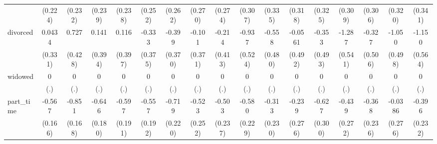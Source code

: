 {\begin{tabular}{l*{16}{c}}
                    &     (0.224)         &     (0.232)         &     (0.239)         &     (0.238)         &     (0.252)         &     (0.262)         &     (0.270)         &     (0.274)         &     (0.307)         &     (0.335)         &     (0.318)         &     (0.325)         &     (0.309)         &     (0.306)         &     (0.320)         &     (0.341)         \\
[1em]
divorced            &      0.0434         &       0.727         &       0.141         &       0.116         &      -0.333         &      -0.399         &      -0.101         &      -0.214         &      -0.937         &      -0.558         &     -0.0561         &      -0.353         &      -1.287\sym{*}  &      -0.327         &      -1.050\sym{*}  &      -1.150\sym{*}  \\
                    &     (0.331)         &     (0.428)         &     (0.394)         &     (0.397)         &     (0.375)         &     (0.370)         &     (0.371)         &     (0.413)         &     (0.524)         &     (0.480)         &     (0.492)         &     (0.493)         &     (0.541)         &     (0.506)         &     (0.498)         &     (0.564)         \\
[1em]
widowed             &           0         &           0         &           0         &           0         &           0         &           0         &           0         &           0         &           0         &           0         &           0         &           0         &           0         &           0         &           0         &           0         \\
                    &         (.)         &         (.)         &         (.)         &         (.)         &         (.)         &         (.)         &         (.)         &         (.)         &         (.)         &         (.)         &         (.)         &         (.)         &         (.)         &         (.)         &         (.)         &         (.)         \\
[1em]
part\_time           &      -0.567\sym{***}&      -0.851\sym{***}&      -0.646\sym{***}&      -0.597\sym{**} &      -0.557\sym{**} &      -0.719\sym{**} &      -0.523\sym{*}  &      -0.503\sym{*}  &      -0.580\sym{*}  &      -0.313         &      -0.239         &      -0.627\sym{*}  &      -0.439         &      -0.368         &     -0.0386         &      -0.396         \\
                    &     (0.166)         &     (0.168)         &     (0.180)         &     (0.191)         &     (0.192)         &     (0.220)         &     (0.252)         &     (0.237)         &     (0.229)         &     (0.230)         &     (0.276)         &     (0.300)         &     (0.272)         &     (0.236)         &     (0.276)         &     (0.232)         \\

\end{tabular}}
